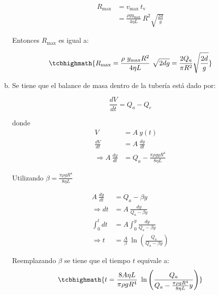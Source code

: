 \begin{enumerate}[a)]
	\begin{align*}
	R_{\text{max}} &= v_{\text{max}} \ t_{\text{v}}\\
	&= \frac{\rho g y_{\text{max}}}{4 \eta L} \ R^2\sqrt{\frac{2d}{g}}
	\end{align*}
	
	Entonces \(R_{\text{max}}\) es igual a:
	
	\begin{equation*}
	\tcbhighmath{ R_{\text{max}} = \dfrac{\rho \ y_{\text{max}} R^2}{4\eta L} \ \sqrt{2dg} = \dfrac{2 Q_a}{\pi R^2} \sqrt{\dfrac{2d}{g}}} 
	\end{equation*}
	
	
	\item Se tiene que el balance de masa dentro de la tubería está dado por:
	
	\begin{equation*}
		\frac{dV}{dt} = Q_a - Q_c
	\end{equation*}
	
	donde 
	\begin{align*}
	V &= A \ y(t) \\
	\frac{dV}{dt} &= A \ \frac{dy}{dt}\\
	\Rightarrow A \ \frac{dy}{dt} &= Q_a - \frac{\pi \rho g y R^4}{8 \eta L}
	\end{align*}
	
	Utilizando \(\beta = \frac{\pi \rho g R^4}{8 \eta L}\)
	
	\begin{align*}
	A \ \frac{dy}{dt} &= Q_a - \beta y\\
	\Rightarrow dt &= A \ \frac{dy}{Q_a - \beta y} \\
	\int_{0}^{t} dt &= A\int_{0}^{y} \frac{dy}{Q_a - \beta y}\\
	\Rightarrow t &= \frac{A}{\beta} \ \ln\left( \frac{Q_a}{Q_a-\beta y} \right)
	\end{align*}
	
	Reemplazando \(\beta\) se tiene que el tiempo \(t\) equivale a:
	\begin{equation*}
	\tcbhighmath{t = \dfrac{8 A \eta L}{\pi \rho g R^4} \ \ln \left( \frac{Q_a}{Q_a - \frac{\pi \rho g R^4}{8\eta L}y} \right)}
	\end{equation*}
	
\end{enumerate}
